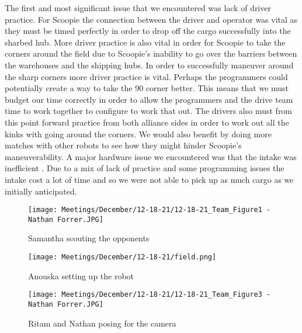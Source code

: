 The first and most significant issue that we encountered was lack of driver practice. For Scoopie the connection between the driver and operator was vital as they must be timed perfectly in order to drop off the cargo successfully into the sharbed hub. More driver practice is also vital in order for Scoopie to take the corners around the field due to Scoopie’s inability to go over the barriers between the warehouses and the shipping hubs. In order to successfully maneuver around the sharp corners more driver practice is vital. Perhaps the programmers could potentially create a way to take the 90 corner better. This means that we must budget our time correctly in order to allow the programmers and the drive team time to work together to configure to work that out. The drivers also must from this point forward practice from both alliance sides in order to work out all the kinks with going around the corners.  We would also benefit by doing more matches with other robots to see how they might hinder Scoopie’s maneuverability. 
A  major hardware issue we encountered was that the intake was inefficient . Due to a mix of lack of practice and some programming issues the intake cost a lot of time and so we were not able to pick up as much cargo as we initially anticipated.




\begin{figure}[ht]
\centering
\begin{minipage}[b]{.48\textwidth}
  \centering
  \texttt{[image: Meetings/December/12-18-21/12-18-21\_Team\_Figure1 - Nathan Forrer.JPG]}
  \caption{Samantha scouting the opponents}
  \label{fig:121821_1}
\end{minipage}%
\hfill%
\begin{minipage}[b]{.48\textwidth}
  \centering
  \texttt{[image: Meetings/December/12-18-21/field.png]}
  \caption{Anouska setting up the robot}
  \label{fig:121821_2}
\end{minipage}
\end{figure}

\begin{figure}[htp]
\centering
\texttt{[image: Meetings/December/12-18-21/12-18-21\_Team\_Figure3 - Nathan Forrer.JPG]}
\caption{Ritam and Nathan posing for the camera}
\label{fig:121821_3}
\end{figure}








